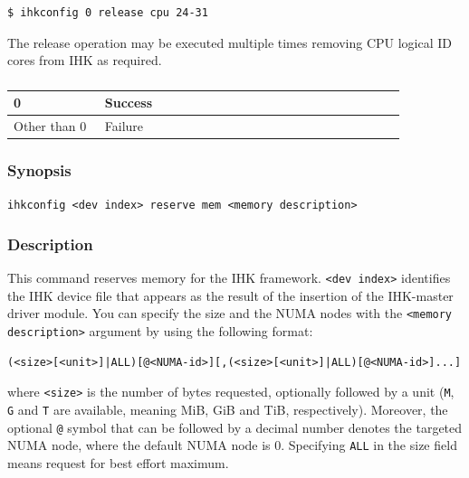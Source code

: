 \documentclass[twoside,11pt,fleqn]{book}
\begin{document}
\begin{verbatim}
$ ihkconfig 0 release cpu 24-31
\end{verbatim}

The release operation may be executed multiple times removing
CPU logical ID cores from IHK as required.

\subsubsection*{}
\begin{table}[!h]
\footnotesize
\begin{tabular}{|p{0.20\linewidth}|p{0.66\linewidth}|} \hline
0&Success\\ \hline
Other than 0&Failure\\ \hline
\end{tabular}
\vspace{-0em}
\end{table}
\FloatBarrier

\subsubsection{}\label{sec:reserve_mem}
\subsubsection*{Synopsis}{\quad} \texttt{ihkconfig <dev index> reserve mem <memory description>}
\subsubsection*{Description}{\quad}
This command reserves memory for the IHK framework.
\texttt{<dev index>} identifies
the IHK device file that appears as the result of the insertion of the
IHK-master driver module.
You can specify the size and the NUMA nodes with the \verb|<memory description>| argument by using the following format:
\begin{verbatim}
(<size>[<unit>]|ALL)[@<NUMA-id>][,(<size>[<unit>]|ALL)[@<NUMA-id>]...]
\end{verbatim}
where \texttt{<size>} is the number of bytes requested, optionally followed by a unit (\texttt{M}, \texttt{G} and \texttt{T} are available, meaning MiB, GiB and TiB, respectively).
Moreover, the optional \texttt{@} symbol that can be followed by a decimal number
denotes the targeted NUMA node, where the default NUMA node is 0.
Specifying \verb:ALL: in the size field means request for best effort maximum.
\end{document}
